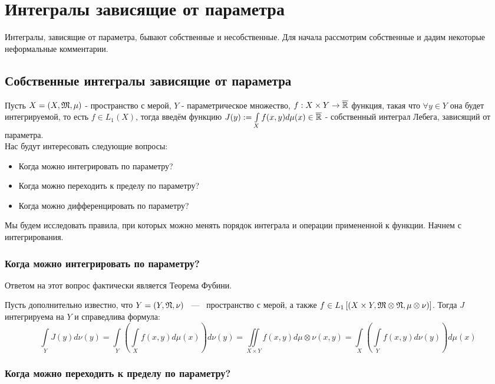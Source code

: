 \section{Интегралы зависящие от параметра}
Интегралы, зависящие от параметра, бывают собственные и несобственные. Для начала рассмотрим собственные и дадим некоторые неформальные комментарии.

\subsection{Собственные интегралы зависящие от параметра}

 Пусть $X = (X, \mathfrak{M}, \mu)$ - пространство с мерой, $Y$ - параметрическое множество, $f : X \times Y \rightarrow \overline{\mathbb{R}}$ функция, такая что $\forall y \in Y$ она будет интегрируемой, то есть $f \in L_1(X)$, тогда введём функцию $J(y) := \int\limits_X f(x, y) d\mu(x) \in \overline{\mathbb{R}}$ - собственный интеграл Лебега, зависящий от параметра. \label{pidp}
\\
Нас будут интересовать следующие вопросы:
\begin{itemize}
    \item Когда можно интегрировать по параметру?
    \item Когда можно переходить к пределу по параметру?
    \item Когда можно дифференцировать по параметру?
\end{itemize}


Мы будем исследовать правила, при которых можно менять порядок интеграла и операции примененной к функции. Начнем с интегрирования.

\subsubsection{Когда можно интегрировать по параметру?}

Ответом на этот вопрос фактически является Теорема Фубини.

\theorem Пусть дополнительно известно, что $Y = (Y, \mathfrak{N}, \nu)$ ~---~ пространство с мерой, а также $f \in L_1\left[ (X \times Y, \mathfrak{M} \otimes \mathfrak{N}, \mu \otimes \nu) \right]$. Тогда $J$ интегрируема на $Y$ и справедлива формула: $$\int\limits_Y J(y)d\nu(y) = \int\limits_Y \left( \int\limits_X f(x,y)d\mu(x) \right) d\nu(y) = \iint\limits_{X \times Y} f(x,y) d \mu\otimes\nu(x, y) = \int\limits_X \left( \int\limits_Y f(x, y) d\nu(y) \right) d\mu(x)$$

\subsubsection{Когда можно переходить к пределу по параметру?}

